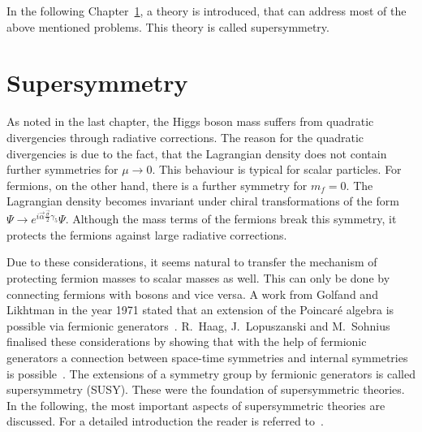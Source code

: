 
In the following Chapter~\ref{ch:Supersymmetry}, a theory is introduced, that can address most of the above mentioned problems.
This theory is called supersymmetry.


\chapter{Supersymmetry}
\label{ch:Supersymmetry}

As noted in the last chapter, the Higgs boson mass suffers from quadratic divergencies through radiative corrections.
The reason for the quadratic divergencies is due to the fact, that the Lagrangian density does not contain further symmetries for $\mu\rightarrow 0 $.
This behaviour is typical for scalar particles.
For fermions, on the other hand, there is a further symmetry for $m_f=0$. 
The Lagrangian density becomes invariant under chiral transformations of the form $\Psi \rightarrow e^{i\vec{\alpha}\frac{\vec{\sigma}}{2} \gamma_5} \Psi$.
Although the mass terms of the fermions break this symmetry, it protects the fermions against large radiative corrections.

Due to these considerations, it seems natural to transfer the mechanism of protecting fermion masses to scalar masses as well.
This can only be done by connecting fermions with bosons and vice versa.
A work from Golfand and Likhtman in the year 1971 stated that an extension of the Poincar\'e  algebra is possible via fermionic generators~\cite{bib:Golfand_Likhtman_1971}.
R.~Haag, J.~Lopuszanski and M.~Sohnius finalised these considerations by showing that with the help of fermionic generators a connection between space-time symmetries and internal symmetries is possible~\cite{bib:Haag_1974}.
The extensions of a symmetry group by fermionic generators is called supersymmetry (SUSY).
These were the foundation of supersymmetric theories.\\

In the following, the most important aspects of supersymmetric theories are discussed.
For a detailed introduction the reader is referred to~\cite{bib:Drees_1996,bib:Aitchison_2005,bib:Drees_2004}.


